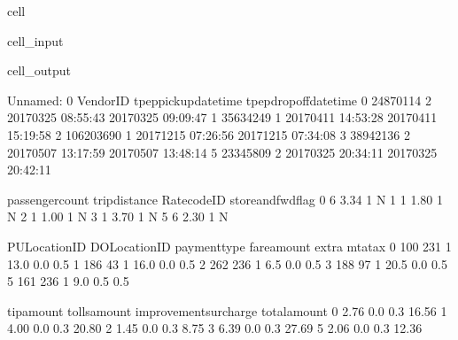 \documentclass[letterpaper,10pt,english]{sphinxmanual}
\begin{document}
\begin{sphinxuseclass}{cell}
\begin{sphinxuseclass}{cell_input}
\begin{sphinxVerbatim}[commandchars=\\\{\}]
\end{sphinxVerbatim}

\end{sphinxuseclass}
\begin{sphinxuseclass}{cell_output}
\begin{sphinxVerbatim}[commandchars=\\\{\}]
   Unnamed: 0  VendorID tpep\PYGZus{}pickup\PYGZus{}datetime tpep\PYGZus{}dropoff\PYGZus{}datetime  \PYGZbs{}
0    24870114         2  2017\PYGZhy{}03\PYGZhy{}25 08:55:43   2017\PYGZhy{}03\PYGZhy{}25 09:09:47   
1    35634249         1  2017\PYGZhy{}04\PYGZhy{}11 14:53:28   2017\PYGZhy{}04\PYGZhy{}11 15:19:58   
2   106203690         1  2017\PYGZhy{}12\PYGZhy{}15 07:26:56   2017\PYGZhy{}12\PYGZhy{}15 07:34:08   
3    38942136         2  2017\PYGZhy{}05\PYGZhy{}07 13:17:59   2017\PYGZhy{}05\PYGZhy{}07 13:48:14   
5    23345809         2  2017\PYGZhy{}03\PYGZhy{}25 20:34:11   2017\PYGZhy{}03\PYGZhy{}25 20:42:11   

   passenger\PYGZus{}count  trip\PYGZus{}distance  RatecodeID store\PYGZus{}and\PYGZus{}fwd\PYGZus{}flag  \PYGZbs{}
0                6           3.34           1                  N   
1                1           1.80           1                  N   
2                1           1.00           1                  N   
3                1           3.70           1                  N   
5                6           2.30           1                  N   

   PULocationID  DOLocationID  payment\PYGZus{}type  fare\PYGZus{}amount  extra  mta\PYGZus{}tax  \PYGZbs{}
0           100           231             1         13.0    0.0      0.5   
1           186            43             1         16.0    0.0      0.5   
2           262           236             1          6.5    0.0      0.5   
3           188            97             1         20.5    0.0      0.5   
5           161           236             1          9.0    0.5      0.5   

   tip\PYGZus{}amount  tolls\PYGZus{}amount  improvement\PYGZus{}surcharge  total\PYGZus{}amount  \PYGZbs{}
0        2.76           0.0                    0.3         16.56   
1        4.00           0.0                    0.3         20.80   
2        1.45           0.0                    0.3          8.75   
3        6.39           0.0                    0.3         27.69   
5        2.06           0.0                    0.3         12.36   


\end{sphinxVerbatim}
\end{sphinxuseclass}
\end{sphinxuseclass}
\end{document}
